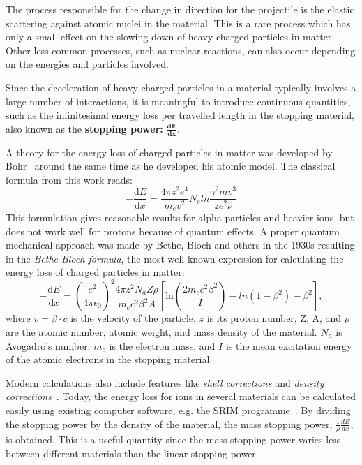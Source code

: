 \documentclass[12pt]{article}
\begin{document}
The process responsible for the change in direction for the
projectile is the elastic scattering against atomic nuclei
in the material. This is a rare process which has only a small
effect on the slowing down of heavy charged particles in matter.
Other less common processes, such as
nuclear reactions, can also occur depending on the energies 
and particles involved.

Since the deceleration of heavy charged particles in a material
typically involves a large number of interactions, it is meaningful
to introduce continuous quantities, such as the infinitesimal energy
loss per travelled length in the stopping material, also known as the \textbf{stopping power:} $\mathbf{\frac{dE}{dx}}$.

A theory for the energy loss of charged particles in matter was
developed by Bohr~\cite{Boh13b,Boh15} around the same time as he
developed his atomic model. The classical formula from this work
reads:
\begin{equation}
\label{eq:Bohr}
-\frac{\mbox{d}E}{\mbox{d}x}=\frac{4\pi z^2 e^4}{m_e v^2}N_e ln\frac{\gamma^2 m v^3}{ze^2 \hat{\nu}}
\end{equation}
This formulation gives reasonable results for alpha particles 
and heavier ions, but
does not work well for protons because of quantum effects. A proper
quantum mechanical approach was made by Bethe, Bloch and others
in the 1930s
resulting in the \emph{Bethe-Bloch formula}, the most well-known
expression for calculating the energy loss of charged particles in
matter:
\begin{equation}
\label{eq:Bethe-Bloch}
-\frac{\mbox{d}E}{\mbox{d}x}=\left(
\frac{e^2}{4\pi\epsilon_0}
\right)^2
\frac{4\pi z^2 N_a Z \rho}{m_e c^2 \beta^2 A}
\left[
\mbox{ln} \left(
\frac{2m_e c^2 \beta^2}{I}
\right)
-ln(1-\beta^2)
-\beta^2
\right],
\end{equation}
where $v=\beta \cdot c$ is the velocity of the particle, $z$ is its
proton number, Z, A, and $\rho$ are the atomic number, atomic weight,
and mass density of the material. $N_a$ is Avogadro's number,
$m_e$ is the electron mass, and $I$ is the mean excitation energy
of the atomic electrons in the stopping material.

Modern calculations also include features like \emph{shell
corrections} and \emph{density corrections}~\cite{Leo93}.
Today, the energy loss for ions in several materials can
be calculated easily using existing computer software, e.g.
the SRIM programme~\cite{SRIM2003}. By dividing the stopping power by
the density of the material, the mass stopping power, $\frac{1}{\rho}$$\frac{dE}{dx}$,
is obtained. This is a useful quantity since the mass stopping power
varies less between different materials than the linear stopping power.
\end{document}
